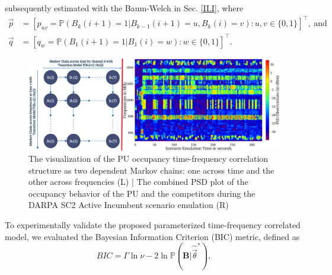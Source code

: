 \documentclass[12pt, draftcls, onecolumn]{IEEEtran}
\begin{document}
subsequently estimated with the Baum-Welch
in Sec. \ref{II.I},
where
\begin{equation}\label{7}
    \begin{aligned}
        \vec{p}&=[p_{uv}=\mathbb{P}(B_{k}(i+1)=1|B_{k-1}(i+1)=u,B_{k}(i)=v):u,v \in \{0,1\}]^{\intercal},\ \text{and}\\
        \vec{q}&=[q_{w}=\mathbb{P}(B_{1}(i+1)=1|B_{1}(i)=w):w \in \{0,1\}]^{\intercal}.
    \end{aligned}
\end{equation}
\begin{figure} [t]
    \centerline{
    \includegraphics[width=0.8\linewidth]{figures/Minerva_Markov_Chain_with_Aggregated_PSD_Observations.png}}
    \vspace{-6mm}
    \caption{The visualization of the PU occupancy time-frequency correlation structure as two dependent Markov chains: one across time and the other across frequencies (L) | The combined PSD plot of the occupancy behavior of the PU and the competitors during the DARPA SC2 Active Incumbent scenario emulation (R)}
    \label{fig:A.3}
    \vspace{-7mm}
\end{figure}
To experimentally validate the proposed parameterized time-frequency correlated model, we  evaluated the Bayesian Information Criterion (BIC) metric,
defined as
\begin{equation}
\label{BIC}
   BIC = \Gamma \ln{\nu} - 2\ln{\mathbb{P}(\mathbf{B}|\hat{\vec{\theta}}^*)},
\end{equation}
\end{document}
